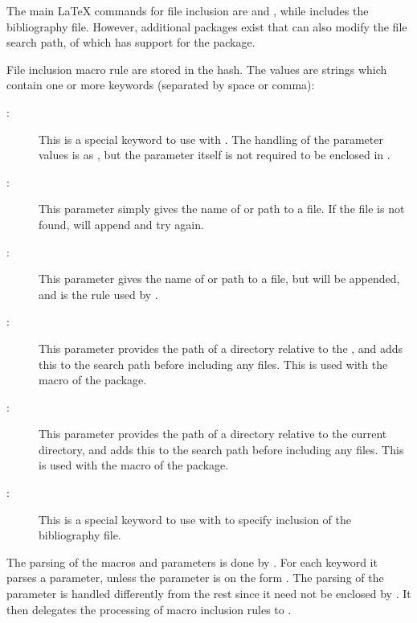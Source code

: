 \documentclass{article}
\begin{document}
The main \LaTeX{} commands for file inclusion are  and , while  includes the  bibliography file. However, additional packages exist that can also modify the file search path, of which \TeXcount{} has support for the  package.

File inclusion macro rule are stored in the  hash. The values are strings which contain one or more keywords (separated by space or comma):
%
\begin{description}

\item[:] This is a special keyword to use with . The handling of the parameter values is as , but the parameter itself is not required to be enclosed in \code{\{\}}.

\item[:] This parameter simply gives the name of or path to a file. If the file is not found, \TeXcount{} will append  and try again.

\item[:] This parameter gives the name of or path to a file, but  will be appended, and is the rule used by .

\item[:] This parameter provides the path of a directory relative to the , and adds this to the search path before including any files. This is used with the  macro of the  package.

\item[:] This parameter provides the path of a directory relative to the current directory, and adds this to the search path before including any files. This is used with the  macro of the  package.

\item[:] This is a special keyword to use with  to specify inclusion of the bibliography file.

\end{description}

The parsing of the macros and parameters is done by . For each keyword it parses a parameter, unless the parameter is on the form . The parsing of the  parameter is handled differently from the rest since it need not be enclosed by \code{\{\}}. It then delegates the processing of macro inclusion rules to .
\end{document}

